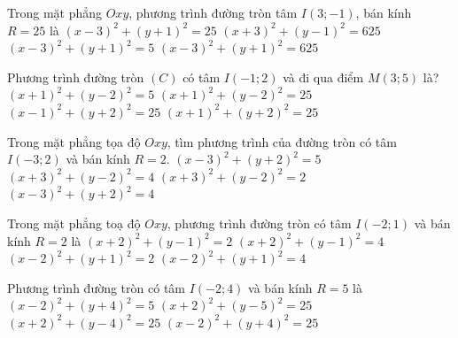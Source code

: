 
\begin{ex}%
	Trong mặt phẳng $O x y$, phương trình đường tròn tâm $I(3;-1)$, bán kính $R=25$ là 
	 \choice
		{$(x-3)^2+(y+1)^2=25$} 
		{$(x+3)^2+(y-1)^2=625$} 
		{$(x-3)^2+(y+1)^2=5$} 
		{\True$(x-3)^2+(y+1)^2=625$} 
\end{ex}

\begin{ex}%
	Phương trình đường tròn $\left(C\right)$ có tâm $I\left(-1;2\right)$  và đi qua điểm $M\left(3;5\right)$ là?
	 \choice
		{$\left(x+1\right)^2+\left(y-2\right)^2=5$} 
		{\True $\left(x+1\right)^2+\left(y-2\right)^2=25$} 
		{$\left(x-1\right)^2+\left(y+2\right)^2=25$} 
		{$\left(x+1\right)^2+\left(y+2\right)^2=25$} 
\end{ex}

\begin{ex}%
	Trong  mặt phẳng tọa độ $Oxy$, tìm phương trình của đường tròn có tâm $I(-3; 2)$ và bán kính $R=2$.
	\choice 
		{$(x-3)^2+(y+2)^2=5$} 
		 {\True $(x+3)^2+(y-2)^2=4$}
		 {$(x+3)^2+(y-2)^2=2$}
		{$(x-3)^2+(y+2)^2=4$} 
\end{ex}

\begin{ex}%
	Trong mặt phẳng  toạ độ $Oxy$, phương trình đường tròn có tâm $I(-2; 1)$ và bán kính $R=2$ là
	\choice 
		 {$(x+2)^2+(y-1)^2=2$}
		{\True $(x+2)^2+(y-1)^2=4$} 
		 {$(x-2)^2+(y+1)^2=2$}
		 {$(x-2)^2+(y+1)^2=4$}
\end{ex}

\begin{ex}%
	Phương  trình đường tròn có tâm $I(-2; 4)$ và bán kính $R = 5$ là
	 \choice
		{$(x-2)^2+(y+4)^2=5$} 
		 {$(x+2)^2+(y-5)^2=25$}
		{\True $(x+2)^2+(y-4)^2=25$} 
		 {$(x-2)^2+(y+4)^2=25$}
\end{ex}

